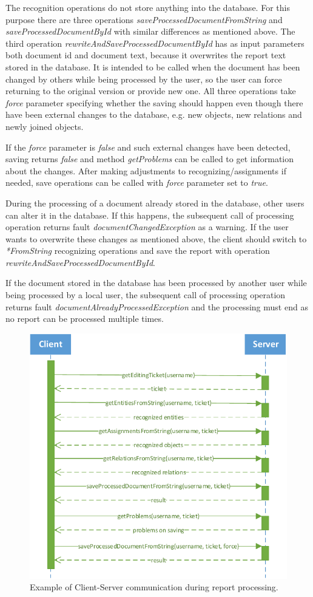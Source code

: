 The recognition operations do not store anything into the database. For this
purpose there are three operations \emph{saveProcessedDocumentFromString} and
\emph{saveProcessedDocumentById} with similar differences as mentioned above.
The third operation \emph{rewriteAndSaveProcessedDocumentById} has as input
parameters both document id and document text, because it overwrites the report
text stored in the database. It is intended to be called when the document has
been changed by others while being processed by the user, so the user can
force returning to the original version or provide new one. All three operations
take \emph{force} parameter specifying whether the saving should happen even
though there have been external changes to the database, e.g. new objects, new
relations and newly joined objects.

If the \emph{force} parameter is \emph{false} and such external changes have
been detected, saving returns \emph{false} and method \emph{getProblems} can be
called to get information about the changes. After making adjustments to
recognizing/assignments if needed, save operations can be called with
\emph{force} parameter set to \emph{true}.

During the processing of a document already stored in the database, other users
can alter it in the database. If this happens, the subsequent call of processing
operation returns fault \emph{documentChangedException} as a warning. If the
user wants to overwrite these changes as mentioned above, the client should
switch to \emph{*FromString} recognizing operations and save the report with
operation \emph{rewriteAndSaveProcessedDocumentById}.

If the document stored in the database has been processed by another user while
being processed by a local user, the subsequent call of processing operation
returns fault \emph{documentAlreadyProcessedException} and the processing must
end as no report can be processed multiple times.

\begin{figure}[!htb]
        \centering
        \includegraphics{Images/ClientServerCommunication}
        \caption{Example of Client-Server communication during report processing.}
        \label{fig:ClientServerCommunication}
\end{figure}
